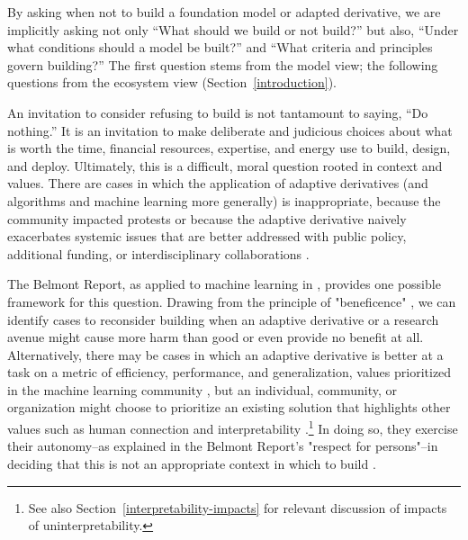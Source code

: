 By asking when not to build a foundation model or adapted derivative, we are implicitly asking not only ``What should we build or not build?'' but also, ``Under what conditions should a model be built?'' and ``What criteria and principles govern building?'' The first question stems from the model view; the following questions from the ecosystem view (Section~\ref{introduction}).

An invitation to consider refusing to build is not tantamount to saying, “Do nothing.” It is an invitation to make deliberate and judicious choices about what is worth the time, financial resources, expertise, and energy use to build, design, and deploy. Ultimately, this is a difficult, moral question rooted in context and values. There are cases in which the application of adaptive derivatives (and algorithms and machine learning more generally) is inappropriate, because the community impacted protests or because the adaptive derivative naively exacerbates systemic issues that are better addressed with public policy, additional funding, or interdisciplinary collaborations \citep{COMPAS_propublica}.

The Belmont Report, as applied to machine learning in \citet{Floridi2018}, provides one possible framework for this question. Drawing from the principle of "beneficence" \citep{belmont_report}, we can identify cases to reconsider building when an adaptive derivative or a research avenue might cause more harm than good or even provide no benefit at all. Alternatively, there may be cases in which an adaptive derivative is better at a task on a metric of efficiency, performance, and generalization, values prioritized in the machine learning community \citep{birhane2020}, but an individual, community, or organization might choose to prioritize an existing solution that highlights other values such as human connection and  interpretability \citep{benjamin_ruha_bioethics}.\footnote{See also Section~\ref{interpretability-impacts} for relevant discussion of impacts of uninterpretability.} In doing so, they exercise their autonomy--as explained in the Belmont Report's "respect for persons"--in deciding that this is not an appropriate context in which to build \citep{belmont_report}. 

